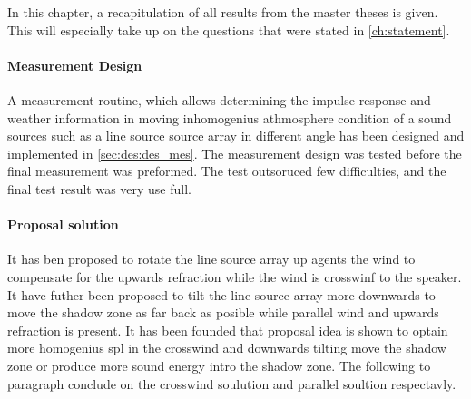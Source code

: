 


In this chapter, a recapitulation of all results from the master theses is given. This will especially take up on the questions that were stated in \autoref{ch:statement}.

\paragraph{Measurement Design}
A measurement routine, which allows determining the impulse response and weather information in moving inhomogenius athmosphere condition of a sound sources such as a line source source array in different angle has been designed and implemented in \autoref{sec:des:des_mes}. The measurement design was tested before the final measurement was preformed. The test outsoruced few difficulties, and the final test result was very use full.  



\paragraph{Proposal solution}
It has ben proposed to rotate the line source array up agents the wind to compensate for the upwards refraction while the wind is crosswinf to the speaker. It have futher been proposed to tilt the line source array more downwards to move the shadow zone as far back as posible while parallel wind and upwards refraction is present. It has been founded that proposal idea is shown to optain more homogenius \gls{spl} in the crosswind and downwards tilting move the shadow zone or produce more sound energy intro the shadow zone. The following to paragraph conclude on the crosswind soulution and parallel soultion respectavly.   




